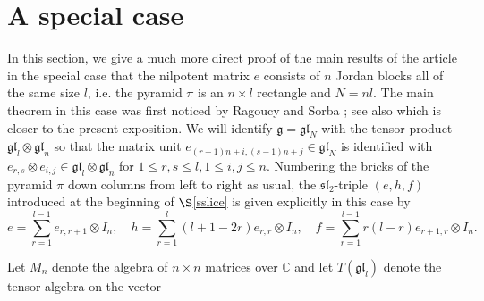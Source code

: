 \documentclass[twoside,12pt,reqno]{amsart}
\def\C{{\mathbb C}}
\def\Mat{M}
\begin{document}
\section{A special case}\label{sspecial}

In this section, we give a much more direct proof
of the main results of the article
in the special case that the nilpotent matrix $e$
consists of $n$ Jordan blocks all of the same size $l$, i.e. the
pyramid $\pi$ is an $n \times l$ rectangle and $N  = nl$.
The main theorem in this case was first noticed by Ragoucy and Sorba
\cite{RS}; see also \cite{BR} which is closer to the present exposition.
We will identify $\mathfrak{g} = \mathfrak{gl}_{N}$
with the tensor product 
$\mathfrak{gl}_l \otimes \mathfrak{gl}_n$
so that the matrix unit $e_{(r-1)n+i, (s-1)n+j} \in \mathfrak{gl}_{N}$
is identified with $e_{r,s} \otimes e_{i,j}
\in \mathfrak{gl}_l \otimes \mathfrak{gl}_n$
for $1 \leq r,s \leq l, 1 \leq i,j \leq n$.
Numbering the bricks of the pyramid $\pi$ down columns from left to right
as usual,
the $\mathfrak{sl}_2$-triple $(e,h,f)$ 
introduced at the beginning of $\S$\ref{sslice}
is given explicitly in this case by
$$
e = \sum_{r=1}^{l-1} e_{r,r+1} \otimes I_n,\quad
h = \sum_{r=1}^l (l+1-2r) e_{r,r} \otimes I_n,\quad
f = \sum_{r=1}^{l-1} r(l-r) e_{r+1,r} \otimes I_n.
$$
\iffalse
Also, 
$$
\mathfrak p = 
\left(
\begin{array}{c|c|c|c}
*&*&*&*\\
\hline
0&*&*&*\\
\hline
0&0&*&*\\
\hline
\vdots&\vdots&\vdots&\ddots
\end{array}
\right),
\qquad
\mathfrak h = 
\left(
\begin{array}{c|c|c|c}
*&0&0&0\\
\hline
0&*&0&0\\
\hline
0&0&*&0\\
\hline
\vdots&\vdots&\vdots&\ddots
\end{array}
\right),
\qquad
\mathfrak m = 
\left(
\begin{array}{c|c|c|c}
0&0&0&0\\
\hline
*&0&0&0\\
\hline
*&*&0&0\\
\hline
\vdots&\vdots&\vdots&\ddots
\end{array}
\right),
$$
viewing matrices in $\mathfrak g$ as
block matrices consisting of $l \times l$ blocks each of size $n \times n$.\fi
Let $\Mat_n$ denote the algebra of $n \times n$ matrices over $\C$
and let $T(\mathfrak{gl}_l)$ denote the tensor algebra on the vector
\end{document}
